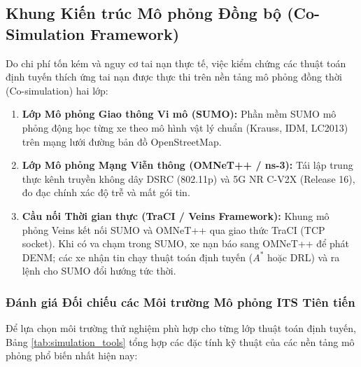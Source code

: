 \documentclass[a4paper]{article}
\begin{document}
\subsection{Khung Kiến trúc Mô phỏng Đồng bộ (Co-Simulation Framework)}
Do chi phí tốn kém và nguy cơ tai nạn thực tế, việc kiểm chứng các thuật toán định tuyến thích ứng tai nạn được thực thi trên nền tảng mô phỏng đồng thời (Co-simulation) hai lớp:
\begin{enumerate}
    \item \textbf{Lớp Mô phỏng Giao thông Vi mô (SUMO):} Phần mềm SUMO mô phỏng động học từng xe theo mô hình vật lý chuẩn (Krauss, IDM, LC2013) trên mạng lưới đường bản đồ OpenStreetMap.
    \item \textbf{Lớp Mô phỏng Mạng Viễn thông (OMNeT++ / ns-3):} Tái lập trung thực kênh truyền không dây DSRC (802.11p) và 5G NR C-V2X (Release 16), đo đạc chính xác độ trễ và mất gói tin.
    \item \textbf{Cầu nối Thời gian thực (TraCI / Veins Framework):} Khung mô phỏng Veins kết nối SUMO và OMNeT++ qua giao thức TraCI (TCP socket). Khi có va chạm trong SUMO, xe nạn báo sang OMNeT++ để phát DENM; các xe nhận tin chạy thuật toán định tuyến ($A^*$ hoặc DRL) và ra lệnh cho SUMO đổi hướng tức thời.
\end{enumerate}

\subsubsection{Đánh giá Đối chiếu các Môi trường Mô phỏng ITS Tiên tiến}
Để lựa chọn môi trường thử nghiệm phù hợp cho từng lớp thuật toán định tuyến, Bảng \ref{tab:simulation_tools} tổng hợp các đặc tính kỹ thuật của các nền tảng mô phỏng phổ biến nhất hiện nay:
\end{document}
